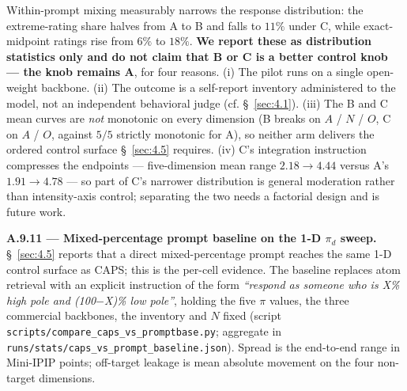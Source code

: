 \begin{table}[t]
\centering
{}
\caption{Within-prompt mixing pilot at $\pi = 0.5$ on Llama-3-8B, five dimensions, $N=8$ runs. Per-item SD is the within-dimension dispersion of Mini-IPIP item ratings, averaged over the five dimensions; extreme = a rating of 1 or 5; literal 3 = the exact scale midpoint. Distribution statistics only --- the control knob remains arm A.}
\label{tab:mix-pilot}
\end{table}

Within-prompt mixing measurably narrows the response distribution: the extreme-rating share halves from A to B and falls to $11\%$ under C, while exact-midpoint ratings rise from $6\%$ to $18\%$. \textbf{We report these as distribution statistics only and do not claim that B or C is a better control knob --- the knob remains A}, for four reasons. (i) The pilot runs on a single open-weight backbone. (ii) The outcome is a self-report inventory administered to the model, not an independent behavioral judge (cf. \S~\ref{sec:4.1}). (iii) The B and C mean curves are \textit{not} monotonic on every dimension (B breaks on $A$ / $N$ / $O$, C on $A$ / $O$, against $5/5$ strictly monotonic for A), so neither arm delivers the ordered control surface \S~\ref{sec:4.5} requires. (iv) C's integration instruction compresses the endpoints --- five-dimension mean range $2.18 \to 4.44$ versus A's $1.91 \to 4.78$ --- so part of C's narrower distribution is general moderation rather than intensity-axis control; separating the two needs a factorial design and is future work.

\label{app:A.9.11}
\textbf{A.9.11 --- Mixed-percentage prompt baseline on the 1-D $\pi_d$ sweep.} \S~\ref{sec:4.5} reports that a direct mixed-percentage prompt reaches the same 1-D control surface as CAPS; this is the per-cell evidence. The baseline replaces atom retrieval with an explicit instruction of the form \textit{``respond as someone who is X\% high pole and (100$-$X)\% low pole''}, holding the five $\pi$ values, the three commercial backbones, the inventory and $N$ fixed (script \texttt{scripts/\allowbreak{}compare\_\allowbreak{}caps\_\allowbreak{}vs\_\allowbreak{}promptbase.py}; aggregate in \texttt{runs/\allowbreak{}stats/\allowbreak{}caps\_\allowbreak{}vs\_\allowbreak{}prompt\_\allowbreak{}baseline.json}). Spread is the end-to-end range in Mini-IPIP points; off-target leakage is mean absolute movement on the four non-target dimensions.

